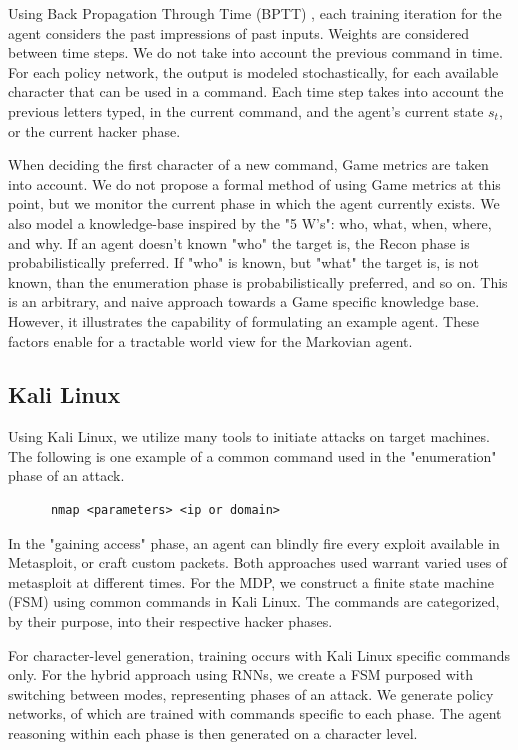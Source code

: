 \documentclass[10pt, titlepage, twocolumn]{article}
\newcommand{\ii}{\indent\indent}
\begin{document}
Using Back Propagation Through Time (BPTT) \cite{backprop}, each training iteration for the agent considers the past impressions of past inputs. Weights are considered between time steps. We do not take into account the previous command in time. For each policy network, the output is modeled stochastically, for each available character that can be used in a command. Each time step takes into account the previous letters typed, in the current command, and the agent's current state \(s_t\), or the current hacker phase.

When deciding the first character of a new command, Game metrics are taken into account. We do not propose a formal method of using Game metrics at this point, but we monitor the current phase in which the agent currently exists. We also model a knowledge-base inspired by the "5 W's": who, what, when, where, and why. If an agent doesn't known "who" the target is, the Recon phase is probabilistically preferred. If "who" is known, but "what" the target is, is not known, than the enumeration phase is probabilistically preferred, and so on. This is an arbitrary, and naive approach towards a Game specific knowledge base. However, it illustrates the capability of formulating an example agent. These factors enable for a tractable world view for the Markovian agent.

\subsection{Kali Linux}
\ii
Using Kali Linux, we utilize many tools to initiate attacks on target machines. The following is one example of a common command used in the "enumeration" phase of an attack.

\begin{verbatim}
      nmap <parameters> <ip or domain>
\end{verbatim}

In the "gaining access" phase, an agent can blindly fire every exploit available in Metasploit, or craft custom packets. Both approaches used warrant varied uses of metasploit at different times. For the MDP, we construct a finite state machine (FSM) using common commands in Kali Linux. The commands are categorized, by their purpose, into their respective hacker phases.

For character-level generation, training occurs with Kali Linux specific commands only. For the hybrid approach using RNNs, we create a FSM purposed with switching between modes, representing phases of an attack. We generate policy networks, of which are trained with commands specific to each phase. The agent reasoning within each phase is then generated on a character level.
\end{document}
